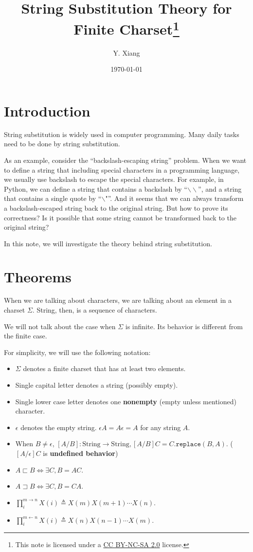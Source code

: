 \documentclass{article}
\title{\vspace{-3em}String Substitution Theory for Finite Charset\footnote{This note is licensed under a \href{https://creativecommons.org/licenses/by-nc-sa/2.0/}{CC BY-NC-SA 2.0} license.}\quad}
\author{Y. Xiang\vspace{1em}}
\date{\today\vspace{-1em}}
\theoremstyle{definition}
\begin{document}
\maketitle

\section{Introduction}

String substitution is widely used in computer programming. Many daily tasks need to be done by string substitution.

As an example, consider the ``backslash-escaping string'' problem.
When we want to define a string that including special characters in a programming language, we usually use backslash to escape the special characters. For example, in Python, we can define a string that contains a backslash by ``$\backslash \backslash$'', and a string that contains a single quote by ``$\backslash \texttt{"}$''. And it seems that we can always transform a backslash-escaped string back to the original string. But how to prove its correctness? Is it possible that some string cannot be transformed back to the original string?

In this note, we will investigate the theory behind string substitution.

\section{Theorems}

When we are talking about characters, we are talking about an element in a charset $\Sigma$. String, then, is a sequence of characters.

We will not talk about the case when $\Sigma$ is infinite. Its behavior is different from the finite case.

For simplicity, we will use the following notation:

\begin{itemize}
    \item $\Sigma$ denotes a finite charset that has at least two elements.
    \item Single capital letter denotes a string (possibly empty).
    \item Single lower case letter denotes one \textbf{nonempty} (empty unless mentioned) character.
    \item $\epsilon$ denotes the empty string. $\epsilon A=A\epsilon=A$ for any string $A$.
    \item When $B\neq \epsilon$, $[A/B]: \text{String} \rightarrow \text{String}, [A/B]C=C.\mathtt{replace}(B, A)$. ($[A/\epsilon]C$ is \textbf{undefined behavior})
    \item $A\sqsubset B\Leftrightarrow \exists C, B = AC$.
    \item $A\sqsupset B\Leftrightarrow \exists C, B = CA$.
    \item $\prod_i^{m\rightarrow n} X(i) \triangleq X(m)X(m+1)\cdots X(n)$.
    \item $\prod_i^{m\leftarrow n} X(i) \triangleq X(n)X(n-1)\cdots X(m)$.
\end{itemize}
\end{document}
